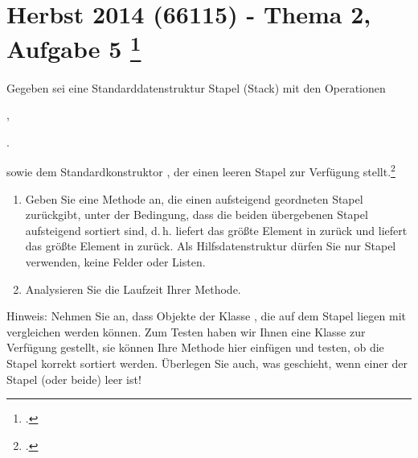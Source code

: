 \documentclass{lehramt-informatik}
\begin{document}
%

\section{Herbst 2014 (66115) - Thema 2, Aufgabe 5
\footcite[Herbst 2014 (66115) - Thema 2, Aufgabe 5, Seite 5]{examen:66115:2014:09}}

Gegeben sei eine Standarddatenstruktur Stapel (Stack) mit den Operationen

\begin{compactitem}
\item {}
\item {},
\item {}.
\end{compactitem}

sowie dem Standardkonstruktor , der einen leeren Stapel
zur Verfügung stellt.\footcite[Seite 2-3, Aufgabe 5]{aud:ab:4}

\begin{enumerate}


\item Geben Sie eine Methode  an,
die einen aufsteigend geordneten Stapel zurückgibt, unter der Bedingung,
dass die beiden übergebenen Stapel aufsteigend sortiert sind, d.\,h.
 liefert das größte Element in  zurück und
 liefert das größte Element in  zurück. Als
Hilfsdatenstruktur dürfen Sie nur Stapel verwenden, keine Felder oder
Listen.

\begin{antwort}
\end{antwort}


\item Analysieren Sie die Laufzeit Ihrer Methode.

\end{enumerate}

\noindent
Hinweis: Nehmen Sie an, dass Objekte der Klasse , die auf
dem Stapel liegen mit  vergleichen werden können. Zum
Testen haben wir Ihnen eine Klasse  zur Verfügung
gestellt, sie können Ihre Methode hier einfügen und testen, ob die
Stapel korrekt sortiert werden. Überlegen Sie auch, was geschieht, wenn
einer der Stapel (oder beide) leer ist!
\end{document}
